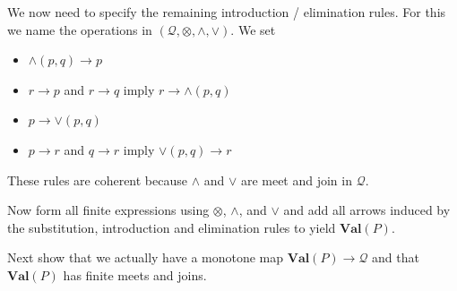 \documentclass[12pt]{article}
\theoremstyle{definition}
\theoremstyle{plain}
\theoremstyle{plain}
\theoremstyle{plain}
\theoremstyle{plain}
\theoremstyle{remark}
\theoremstyle{remark}
\newcommand{\mc}[1]{\mathcal{#1}}
\begin{document}
We now need to specify the remaining introduction / elimination rules. For this we name the operations in $(\mc{Q},\otimes, \wedge, \vee)$. We set
\begin{itemize}
	\item $\wedge(p,q) \rightarrow  p$
	\item $r \rightarrow p$ and $r \rightarrow q$ imply $r \rightarrow \wedge(p,q)$
	\item $p \rightarrow \vee(p,q)$
	\item $p \rightarrow r$ and $q \rightarrow r$ imply $\vee(p,q) \rightarrow r$	
\end{itemize}

These rules are coherent because $\wedge$ and $\vee$ are meet and join in $\mc{Q}$.

Now form all finite expressions using $\otimes$, $\wedge$, and $\vee$ and add all arrows induced by the substitution, introduction and elimination rules to yield $\mathbf{Val}(P)$. 

Next show that we actually have a monotone map $\mathbf{Val}(P) \rightarrow \mc{Q}$ and that $\mathbf{Val}(P)$ has finite meets and joins. 


\newpage
\printbibliography
\end{document}
